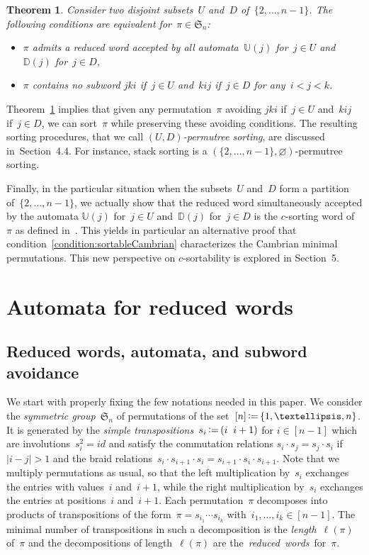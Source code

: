 \documentclass[11pt]{article}
\newtheorem{theorem}[theo]{Theorem}
\theoremstyle{definition}
\numberwithin{equation}{section}
\newcommand{\fS}{\mathfrak{S}}
\newcommand{\eqdef}{\mbox{\,\raisebox{0.2ex}{\scriptsize\ensuremath{\mathrm:}}\ensuremath{=}\,}}
\newcommand{\defn}[1]{\textsl{\color{darkblue} #1}}
\newcommand{\automatonU}{\mathbb{U}}
\newcommand{\automatonD}{\mathbb{D}}
\begin{document}
\begin{theorem}\label{thm:permutreeMinimal}
Consider two disjoint subsets~$U$ and~$D$ of~$\{2, \dots, n-1\}$.
The following conditions are equivalent for~$\pi \in \fS_n$:
\begin{itemize}
	\item $\pi$ admits a reduced word accepted by all automata~$\automatonU(j)$ for~$j \in U$ and~$\automatonD(j)$ for~${j \in D}$,
	\item $\pi$ contains no subword $jki$ if~$j \in U$ and~$kij$ if~$j \in D$ for any~$i < j < k$.
\end{itemize}
\end{theorem}

Theorem~\ref{thm:permutreeMinimal} implies that given any permutation~$\pi$ avoiding $jki$ if~$j \in U$ and~$kij$ if~$j \in D$, we can sort~$\pi$ while preserving these avoiding conditions.
The resulting sorting procedures, that we call \defn{$(U,D)$-permutree sorting}, are discussed in~Section~4.4.
For instance, stack sorting is a $(\{2, \dots, n-1\}, \varnothing)$-permutree sorting.

Finally, in the particular situation when the subsets~$U$ and~$D$ form a partition of~$\{2, \dots, n-1\}$, we actually show that the reduced word simultaneously accepted by the automata $\automatonU(j)$ for~${j \in U}$ and~$\automatonD(j)$ for~$j \in D$ is the $c$-sorting word of~$\pi$ as defined in~\cite{Reading-coxeterSortable}.
This yields in particular an alternative proof that condition~\ref{condition:sortableCambrian} characterizes the Cambrian minimal permutations.
This new perspective on $c$-sortability is explored in Section~5.

\section{Automata for reduced words}\label{sec:proofPatternAvoidance}

\subsection{Reduced words, automata, and subword avoidance}

We start with properly fixing the few notations needed in this paper.
We consider the \defn{symmetric group}~$\fS_n$ of permutations of the set~$[n] \eqdef \{1,\dots,n\}$.
It is generated by the \defn{simple transpositions}~$s_i \eqdef (i \;\; i+1)$ for $i \in [n-1]$ which are involutions~$s_i^2 = id$ and satisfy the commutation relations $s_i \cdot s_j =s_j \cdot s_i$ if $|i-j|>1$ and the braid relations~$s_i \cdot s_{i+1} \cdot s_i = s_{i+1} \cdot s_i \cdot s_{i+1}$.
Note that we multiply permutations as usual, so that the left multiplication by~$s_i$ exchanges the entries with values~$i$ and~$i+1$, while the right multiplication by~$s_i$ exchanges the entries at positions~$i$ and~$i+1$.
Each permutation~$\pi$ decomposes into products of transpositions of the form~$\pi = s_{i_1} \cdots s_{i_k}$ with~$i_1, \dots, i_k \in [n-1]$.
The minimal number of transpositions in such a decomposition is the \defn{length}~$\ell(\pi)$ of~$\pi$ and the decompositions of length~$\ell(\pi)$ are \mbox{the \defn{reduced words} for~$\pi$}.
\end{document}
